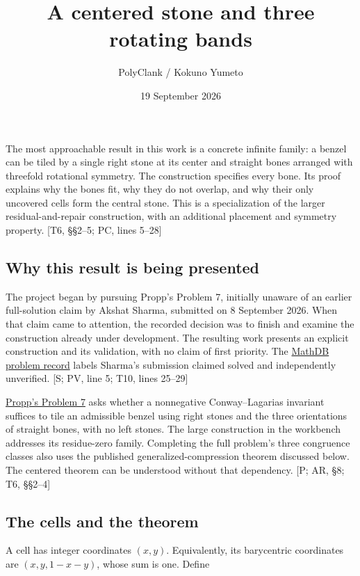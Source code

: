 \documentclass[
  11pt,
]{article}
\title{A centered stone and three rotating bands}
\author{PolyClank / Kokuno Yumeto}
\date{19 September 2026}
\begin{document}
\maketitle

The most approachable result in this work is a concrete infinite family:
a benzel can be tiled by a single right stone at its center and straight
bones arranged with threefold rotational symmetry. The construction
specifies every bone. Its proof explains why the bones fit, why they do
not overlap, and why their only uncovered cells form the central stone.
This is a specialization of the larger residual-and-repair construction,
with an additional placement and symmetry property. {[}T6, §§2--5; PC,
lines 5--28{]}

\subsection{Why this result is being
presented}\label{why-this-result-is-being-presented}

The project began by pursuing Propp's Problem 7, initially unaware of an
earlier full-solution claim by Akshat Sharma, submitted on 8 September
2026. When that claim came to attention, the recorded decision was to
finish and examine the construction already under development. The
resulting work presents an explicit construction and its validation,
with no claim of first priority. The
\href{https://mathdb.com/p/405267/existence-of-benzel-tilings-with-nonnegative-conway-lagarias}{MathDB
problem record} labels Sharma's submission claimed solved and
independently unverified. {[}S; PV, line 5; T10, lines 25--29{]}

\href{https://arxiv.org/html/2206.06472v4}{Propp's Problem 7} asks
whether a nonnegative Conway--Lagarias invariant suffices to tile an
admissible benzel using right stones and the three orientations of
straight bones, with no left stones. The large construction in the
workbench addresses its residue-zero family. Completing the full
problem's three congruence classes also uses the published
generalized-compression theorem discussed below. The centered theorem
can be understood without that dependency. {[}P; AR, §8; T6, §§2--4{]}

\subsection{The cells and the theorem}\label{the-cells-and-the-theorem}

A cell has integer coordinates \((x,y)\). Equivalently, its barycentric
coordinates are \((x,y,1-x-y)\), whose sum is one. Define
\end{document}
